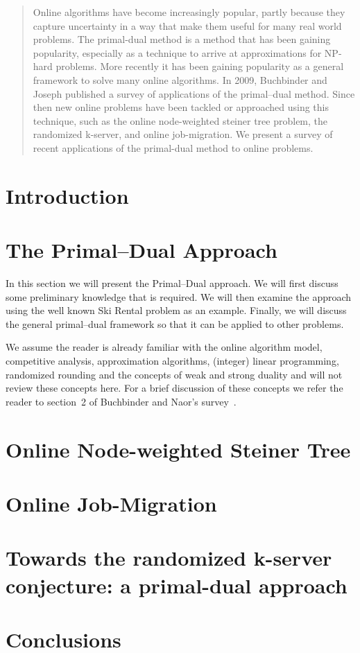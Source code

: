 \documentclass[10pt, twocolumn]{article}
\begin{document}
\maketitle

\begin{abstract}
Online algorithms have become increasingly popular, partly because they capture uncertainty in a way that make them useful for many real world problems. The primal-dual method is a method that has been gaining popularity, especially as a technique to arrive at approximations for NP-hard problems.  More recently it has been gaining popularity as a general framework to solve many online algorithms. In 2009, Buchbinder and Joseph published a survey of applications of the primal--dual method. Since then new online problems have been tackled or approached using this technique, such as the online node-weighted steiner tree problem, the randomized k-server, and online job-migration. We present a survey of recent applications of the primal-dual method to online problems.
\end{abstract}

\section{Introduction}




\section{The Primal--Dual Approach}

In this section we will present the Primal--Dual approach. We will first discuss some preliminary knowledge that is required. We will then examine the approach using the well known Ski Rental problem as an example. Finally, we will discuss the general primal--dual framework so that it can be applied to other problems.

We assume the reader is already familiar with the online algorithm model, competitive analysis, approximation algorithms, (integer) linear programming, randomized rounding and the concepts of weak and strong duality and will not review these concepts here. For a brief discussion of these concepts we refer the reader to section~2 of Buchbinder and Naor's survey~\cite{buchbinder09:survey}.





\section{Online Node-weighted Steiner Tree}


\section{Online Job-Migration}


\section{Towards the randomized k-server conjecture: a primal-dual approach}


\section{Conclusions}



\end{document}
